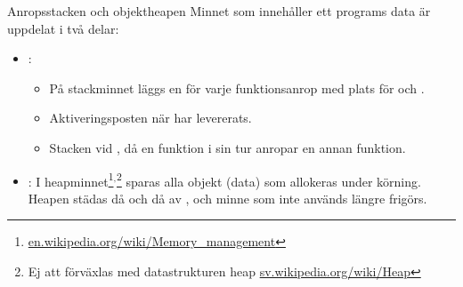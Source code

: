 
\begin{Slide}{Anropsstacken och objektheapen}\SlideFontSmall
	Minnet som innehåller ett programs data är uppdelat i två delar:
	\begin{itemize}
		\item {}:
		      \begin{itemize}\SlideFontSmall
			      \item På stackminnet läggs en   för varje funktionsanrop med plats för  och .
			      \item Aktiveringsposten  när  har levererats.
			      \item Stacken  vid , då en funktion i sin tur anropar en annan funktion.
		      \end{itemize}
		\item {}: I heapminnet\footnote{\href{https://en.wikipedia.org/wiki/Memory_management}{en.wikipedia.org/wiki/Memory\_management}}$^{,}$\footnote{Ej att förväxlas med datastrukturen heap  \href{https://sv.wikipedia.org/wiki/Heap}{sv.wikipedia.org/wiki/Heap}} sparas alla objekt (data) som allokeras under körning. Heapen städas då och då av  , och minne som inte används längre frigörs. \\\vspace{0.5em}
	\end{itemize}
\end{Slide}

